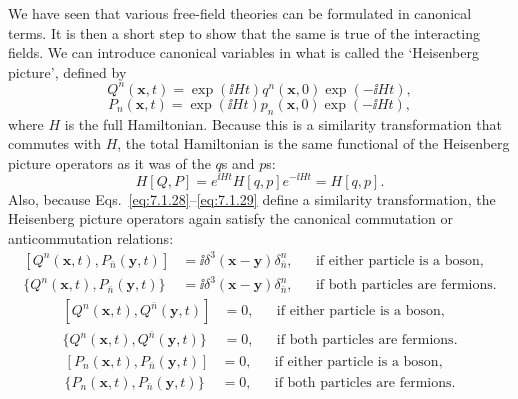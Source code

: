 We have seen that various free-field theories can be formulated in
canonical terms. It is then a short step to show that the same is true of the
interacting fields. We can introduce canonical variables in what is called
the `Heisenberg picture', defined by
\begin{equation}
Q^n(\mathbf{x},t)=\exp(\ii Ht)q^n(\mathbf{x},0)\exp(-\ii Ht),
\tag{7.1.28}\label{eq:7.1.28}
\end{equation}
\begin{equation}
P_n(\mathbf{x},t)=\exp(\ii Ht)p_n(\mathbf{x},0)\exp(-\ii Ht),
\tag{7.1.29}\label{eq:7.1.29}
\end{equation}
where $H$ is the full Hamiltonian. Because this is a similarity transformation
that commutes with $H$, the total Hamiltonian is the same functional of
the Heisenberg picture operators as it was of the $q$s and $p$s:
\[
H[Q,P]=e^{\ii Ht}H[q,p]e^{-\ii Ht}=H[q,p].
\]
Also, because Eqs.~\eqref{eq:7.1.28}--\eqref{eq:7.1.29} define a similarity transformation, the
Heisenberg picture operators again satisfy the canonical commutation or
anticommutation relations:
\begin{equation}
\begin{aligned}
[Q^n(\mathbf{x},t),P_{\bar n}(\mathbf{y},t)]
&=\ii\delta^3(\mathbf{x}-\mathbf{y})\delta^n_{\bar n},
&&\text{if either particle is a boson},\\
\{Q^n(\mathbf{x},t),P_{\bar n}(\mathbf{y},t)\}
&=\ii\delta^3(\mathbf{x}-\mathbf{y})\delta^n_{\bar n},
&&\text{if both particles are fermions}.
\end{aligned}
\tag{7.1.30}\label{eq:7.1.30}
\end{equation}
\begin{equation}
\begin{aligned}
[Q^n(\mathbf{x},t),Q^{\bar n}(\mathbf{y},t)]&=0,
&&\text{if either particle is a boson},\\
\{Q^n(\mathbf{x},t),Q^{\bar n}(\mathbf{y},t)\}&=0,
&&\text{if both particles are fermions}.
\end{aligned}
\tag{7.1.31}\label{eq:7.1.31}
\end{equation}
\begin{equation}
\begin{aligned}
[P_n(\mathbf{x},t),P_{\bar n}(\mathbf{y},t)]&=0,
&&\text{if either particle is a boson},\\
\{P_n(\mathbf{x},t),P_{\bar n}(\mathbf{y},t)\}&=0,
&&\text{if both particles are fermions}.
\end{aligned}
\tag{7.1.32}\label{eq:7.1.32}
\end{equation}
